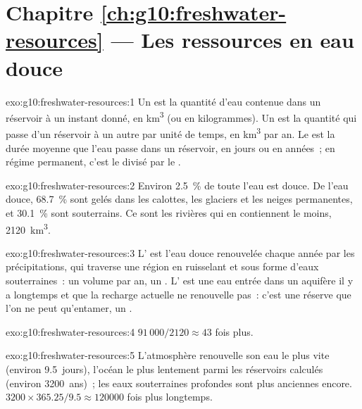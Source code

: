 \section*{Chapitre \ref{ch:g10:freshwater-resources} --- Les ressources en eau douce}

\begin{solution}{exo:g10:freshwater-resources:1}
Un  est la quantité d'eau contenue dans un réservoir à un instant
donné, en \unit{km^3} (ou en kilogrammes). Un  est la quantité qui passe
d'un réservoir à un autre par unité de temps, en \unit{km^3} par an. Le
 est la durée moyenne que l'eau passe dans un réservoir,
en jours ou en années~; en régime permanent, c'est le  divisé par le
.
\end{solution}

\begin{solution}{exo:g10:freshwater-resources:2}
Environ \qty{2.5}{\percent} de toute l'eau est douce. De l'eau douce,
\qty{68.7}{\percent} sont gelés dans les calottes, les glaciers et les
neiges permanentes, et \qty{30.1}{\percent} sont souterrains. Ce sont les
rivières qui en contiennent le moins, \num{2120}~\unit{km^3}.
\end{solution}

\begin{solution}{exo:g10:freshwater-resources:3}
L' est l'eau douce renouvelée chaque année par les
précipitations, qui traverse une région en ruisselant et sous forme d'eaux
souterraines~: un volume par an, un . L' est une
eau entrée dans un aquifère il y a longtemps et que la recharge actuelle ne
renouvelle pas~: c'est une réserve que l'on ne peut qu'entamer, un .
\end{solution}

\begin{solution}{exo:g10:freshwater-resources:4}
$91\,000/2120 \approx 43$ fois plus.
\end{solution}

\begin{solution}{exo:g10:freshwater-resources:5}
L'atmosphère renouvelle son eau le plus vite (environ \num{9.5}~jours),
l'océan le plus lentement parmi les réservoirs calculés (environ
\num{3200}~ans)~; les eaux souterraines profondes sont plus anciennes
encore. $3200 \times 365.25/9.5 \approx \num{120000}$ fois plus longtemps.
\end{solution}

